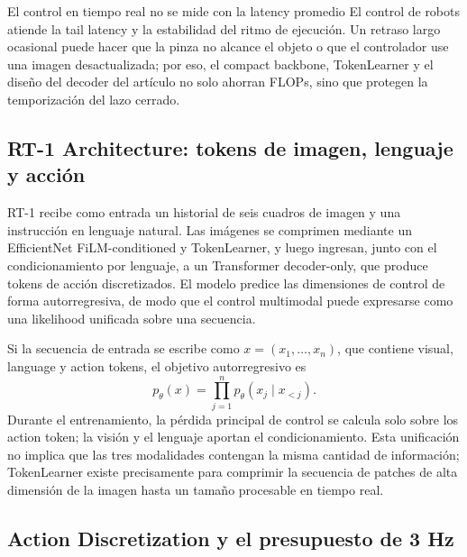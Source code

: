 \begin{warningbox}{El control en tiempo real no se mide con la latency promedio}
El control de robots atiende la tail latency y la estabilidad del ritmo de ejecución. Un retraso largo ocasional puede hacer que la pinza no alcance el objeto o que el controlador use una imagen desactualizada; por eso, el compact backbone, TokenLearner y el diseño del decoder del artículo no solo ahorran FLOPs, sino que protegen la temporización del lazo cerrado.
\end{warningbox}

\subsection{RT-1 Architecture: tokens de imagen, lenguaje y acción}

RT-1 recibe como entrada un historial de seis cuadros de imagen y una instrucción en lenguaje natural. Las imágenes se comprimen mediante un EfficientNet FiLM-conditioned y TokenLearner, y luego ingresan, junto con el condicionamiento por lenguaje, a un Transformer decoder-only, que produce tokens de acción discretizados. El modelo predice las dimensiones de control de forma autorregresiva, de modo que el control multimodal puede expresarse como una likelihood unificada sobre una secuencia.


Si la secuencia de entrada se escribe como $x=(x_1,\ldots,x_n)$, que contiene visual, language y action tokens, el objetivo autorregresivo es
\begin{equation}
p_{\theta}(x)=\prod_{j=1}^{n}p_{\theta}(x_j\mid x_{<j}).
\end{equation}
Durante el entrenamiento, la pérdida principal de control se calcula solo sobre los action token; la visión y el lenguaje aportan el condicionamiento. Esta unificación no implica que las tres modalidades contengan la misma cantidad de información; TokenLearner existe precisamente para comprimir la secuencia de patches de alta dimensión de la imagen hasta un tamaño procesable en tiempo real.

\subsection{Action Discretization y el presupuesto de 3 Hz}

